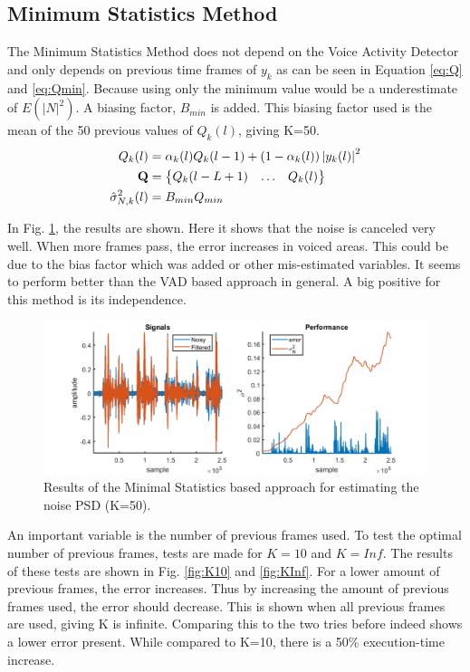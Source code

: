 \clearpage

\subsection{Minimum Statistics Method}
The Minimum Statistics Method does not depend on the Voice Activity Detector and only depends on previous time frames of $y_{k}$ as can be seen in Equation \ref{eq:Q} and \ref{eq:Qmin}. Because using only the minimum value would be a underestimate of $E(|N|^2)$. A biasing factor, $B_{min}$ is added. This biasing factor used is the mean of the 50 previous values of $Q_k(l)$, giving K=50.
\begin{align}
Q_{k}(l) &= \alpha_k(l)Q_k(l-1)+(1-\alpha_k(l))\abs{y_{k}(l)}^{2}\label{eq:Qk} \\
  \mathbf{Q} &=
  \begin{Bmatrix}
    Q_{k}(l-L+1) & \hdots & Q_{k}(l)
  \end{Bmatrix}
  \label{eq:Q} \\
  \hat \sigma_{N,k}^{2}(l) &= B_{min}Q_{min}
  \label{eq:Qmin}\\
\end{align}

In Fig. \ref{fig:minstatnoise}, the results are shown. Here it shows that the noise is canceled very well. When more frames pass, the error increases in voiced areas. This could be due to the bias factor which was added or other mis-estimated variables. It seems to perform better than the VAD based approach in general. A big positive for this method is its independence.

\begin{figure}[h]
  \centering
  \includegraphics[width=\textwidth]{images/msmethod.png}
  \caption{Results of the Minimal Statistics based approach for estimating the noise PSD (K=50).}
  \label{fig:minstatnoise}
\end{figure}

An important variable is the number of previous frames used. To test the optimal number of previous frames, tests are made for $K=10$ and $K=Inf$. The results of these tests are shown in Fig. \ref{fig:K10} and \ref{fig:KInf}. For a lower amount of previous frames, the error increases. Thus by increasing the amount of previous frames used, the error should decrease. This is shown when all previous frames are used, giving K is infinite. Comparing this to the two tries before indeed shows a lower error present. While compared to K=10, there is a 50\% execution-time increase.

